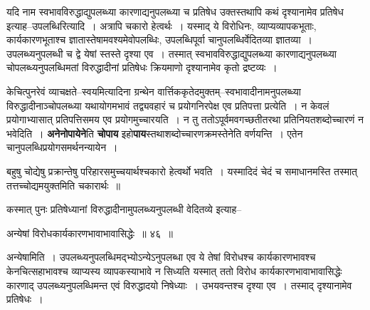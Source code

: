 \documentclass[article,12pt,a4paper]{memoir}
\begin{document}
	  \pstart यदि नाम स्वभावविरुद्धाद्युपलब्ध्या कारणाद्यनुपलब्ध्या च प्रतिषेध उक्तस्तथापि कथं दृश्यानामेव प्रतिषेध इत्याह--उपलब्धिरित्यादि । अत्रापि चकारो हेत्वर्थः । यस्माद् ये विरोधिनः, व्याप्यव्यापकभूताः, कार्यकारणभूताश्च ज्ञातास्तेषामवश्यमेवोपलब्धिः, उपलब्धिपूर्वा चानुपलब्धिर्वेदितव्या ज्ञातव्या । उपलब्ध्यनुपलब्धी च द्वे येषां स्तस्ते दृश्या एव । तस्मात् स्वभावविरुद्धाद्युपलब्ध्या कारणाद्यनुपलब्ध्या चोपलब्ध्यनुपलब्धिमतां विरुद्धादीनां प्रतिषेधः क्रियमाणो दृश्यानामेव कृतो द्रष्टव्यः ।
	\pend
      
	  \endgroup
	

	  \pstart केचित्पुनरेवं व्याचक्षते--स्वयमित्यादिना ग्रन्थेन वार्त्तिककृतेदमुक्तम्--स्वभावादीनामनुपलब्ध्या विरुद्धादीनाञ्चोपलब्ध्या यथायोगमभावं तद्व्यवहारं च प्रयोगनिरपेक्ष एव प्रतिपत्ता प्रत्येति । न केवलं प्रयोगाभ्यासात् प्रतिपत्तिसमय एव प्रयोगमुच्चारयति । न तु ततोऽपूर्वमवगच्छतीतरथा प्रतिनियतशब्दोच्चारणं न भवेदिति । \textbf{अनेनोपायेने}ति \textbf{चोपाय} इहो\textbf{पाय}स्तथाशब्दोच्चारणक्रमस्तेनेति वर्णयन्ति । एतेन चानुपलब्धिप्रयोगसमर्थनन्यायेन ।
	\pend
	  \bigskip
	  \begingroup
	

	  \pstart बहुषु चोद्येषु प्रक्रान्तेषु परिहारसमुच्चयार्थश्चकारो हेत्वर्थो भवति । यस्मादिदं चेदं च समाधानमस्ति तस्मात् तत्तच्चोद्यमयुक्तमिति चकारार्थः ॥
	\pend
        

	  \pstart कस्मात् पुनः प्रतिषेध्यानां विरुद्धादीनामुपलब्ध्यनुपलब्धी वेदितव्ये इत्याह--
	\pend
        
	  \bigskip
	  \begingroup
	

	  \pstart अन्येषां विरोधकार्यकारणभावाभावासिद्धेः ॥ ४६ ॥
	\pend
      
	  \endgroup
	 

	  \pstart अन्येषामिति । उपलब्ध्यनुपलब्धिमद्भ्योऽन्येऽनुपलब्धा एव ये तेषां विरोधश्च कार्यकारणभावश्च केनचित्सहाभावश्च व्याप्यस्य व्यापकस्याभावे न सिध्यति यस्मात् ततो विरोध कार्यकारणभावाभावासिद्धेः कारणाद् उपलब्ध्यनुपलब्धिमन्त एवं विरुद्धादयो निषेध्याः । उभयवन्तश्च दृश्या एव । तस्माद् दृश्यानामेव प्रतिषेधः ।
	\pend
        
\end{document}
